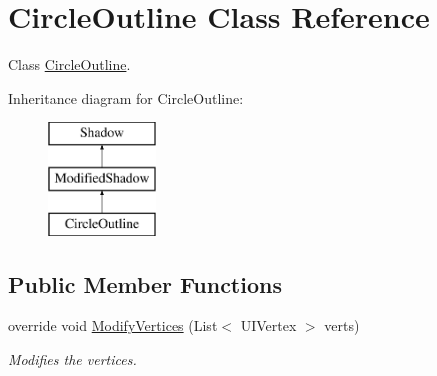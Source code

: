\hypertarget{class_circle_outline}{}\section{Circle\+Outline Class Reference}
\label{class_circle_outline}


Class \hyperlink{class_circle_outline}{Circle\+Outline}.  


Inheritance diagram for Circle\+Outline\+:\begin{figure}[H]
\begin{center}
\leavevmode
\includegraphics[height=3.000000cm]{class_circle_outline}
\end{center}
\end{figure}
\subsection*{Public Member Functions}
\begin{DoxyCompactItemize}
\item 
override void \hyperlink{class_circle_outline_a60ecaf1389896d2bca9b38c8767ca20a}{Modify\+Vertices} (List$<$ U\+I\+Vertex $>$ verts)
\begin{DoxyCompactList}\small\item\em Modifies the vertices. \end{DoxyCompactList}\end{DoxyCompactItemize}
